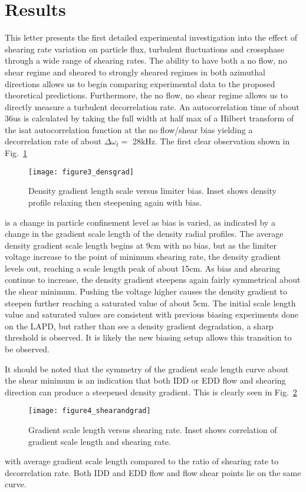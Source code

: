 \documentclass[%
 aip,
 amsmath,amssymb,
 preprint,%
]{revtex4-1}
\begin{document}
\section{Results}
This letter presents the first detailed experimental investigation into the effect of shearing rate variation on particle flux, turbulent fluctuations and crossphase through a wide range of shearing rates. The ability to have both a no flow, no shear regime and sheared to strongly sheared regimes in both azimuthal directions allows us to begin comparing experimental data to the proposed theoretical predictions. Furthermore, the no flow, no shear regime allows us to directly measure a turbulent decorrelation rate. An autocorrelation time of about 36us is calculated by taking the full width at half max of a Hilbert transform of the isat autocorrelation function at the no flow/shear bias yielding a decorrelation rate of about $\Delta \omega_{t} = $ 28kHz.
The first clear observation shown in
Fig.~\ref{fig:densgrad}
\begin{figure}
\texttt{[image: figure3\_densgrad]}%
\caption{\label{fig:densgrad} Density gradient length scale versus limiter bias. Inset shows density profile relaxing then steepening again with bias.}
\end{figure}
is a change in particle confinement level as bias is varied, as indicated by a change in the gradient scale length of the density radial profiles. The average density gradient scale length begins at 9cm with no bias, but as the limiter voltage increase to the point of minimum shearing rate, the density gradient levels out, reaching a scale length peak of about 15cm. As bias and shearing continue to increase, the density gradient steepens again fairly symmetrical about the shear minimum. Pushing the voltage higher causes the density gradient to steepen further reaching a saturated value of about 5cm. The initial scale length value and saturated values are consistent with previous biasing experiments done on the LAPD, but rather than see a density gradient degradation, a sharp threshold is observed. It is likely the new biasing setup allows this transition to be observed.

It should be noted that the symmetry of the gradient scale length curve about the shear minimum is an indication that both IDD or EDD flow and shearing direction can produce a steepened density gradient. This is clearly seen in
Fig.~\ref{fig:shearandgrad}
\begin{figure}
\texttt{[image: figure4\_shearandgrad]}%
\caption{\label{fig:shearandgrad} Gradient scale length versus shearing rate. Inset shows correlation of gradient scale length and shearing rate.}
\end{figure}
with average gradient scale length compared to the ratio of shearing rate to decorrelation rate. Both IDD and EDD flow and flow shear points lie on the same curve.
\end{document}
